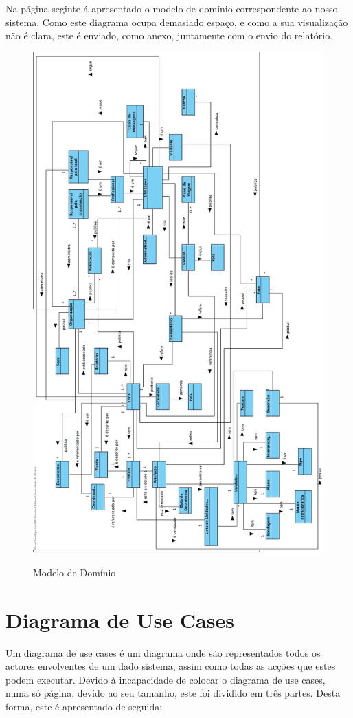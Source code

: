 ﻿\documentclass[12pt,a4paper]{article}
\begin{document}
Na página seginte á apresentado o modelo de domínio correspondente ao nosso sistema. Como este diagrama ocupa demasiado espaço, e como  a sua visualização não é clara, este é enviado, como anexo, juntamente com o envio do relatório.
\newpage

\begin{figure}[h!]
\centering
\includegraphics[scale=0.4]{dominio}
\label{modelo domínio}
\caption{Modelo de Domínio}
\end{figure}


\clearpage
\section{Diagrama de Use Cases}
Um diagrama de use cases é um diagrama onde são representados todos os actores envolventes de um dado sistema, assim como todas as acções que estes podem executar. Devido à incapacidade de colocar o diagrama de use cases, numa só página, devido ao seu tamanho, este foi dividido em três partes. Desta forma, este é apresentado de seguida:\\
\end{document}
